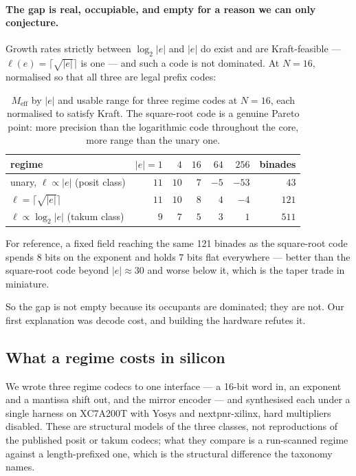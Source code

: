 \documentclass[11pt]{article}
\theoremstyle{definition}
\begin{document}
\paragraph{The gap is real, occupiable, and empty for a reason we can only
conjecture.} Growth rates strictly between $\log_2|e|$ and $|e|$ do exist and are
Kraft-feasible --- $\ell(e) = \lceil\sqrt{|e|}\rceil$ is one --- and such a code
is not dominated. At $N = 16$, normalised so that all three are legal prefix
codes:

\begin{table}[t]\centering
\caption{$M_{\mathrm{eff}}$ by $|e|$ and usable range for three regime codes at
$N = 16$, each normalised to satisfy Kraft. The square-root code is a genuine
Pareto point: more precision than the logarithmic code throughout the core, more
range than the unary one.}
\label{tab:codes}
\begin{tabular}{lrrrrrr}
\toprule
regime & $|e|{=}1$ & $4$ & $16$ & $64$ & $256$ & binades \\
\midrule
unary, $\ell \propto |e|$ (posit class)      & $11$ & $10$ & $7$ & $-5$ & $-53$ & $43$ \\
$\ell = \lceil\sqrt{|e|}\rceil$              & $11$ & $10$ & $8$ & $4$  & $-4$  & $121$ \\
$\ell \propto \log_2|e|$ (takum class)       & $9$  & $7$  & $5$ & $3$  & $1$   & $511$ \\
\bottomrule
\end{tabular}
\end{table}

For reference, a fixed field reaching the same 121 binades as the square-root code
spends 8 bits on the exponent and holds $7$ bits flat everywhere --- better than
the square-root code beyond $|e| \approx 30$ and worse below it, which is the
taper trade in miniature.

So the gap is not empty because its occupants are dominated; they are not. Our
first explanation was decode cost, and building the hardware refutes it.

\subsection{What a regime costs in silicon}\label{sec:regimecost}

We wrote three regime codecs to one interface --- a 16-bit word in, an exponent
and a mantissa shift out, and the mirror encoder --- and synthesised each under a
single harness on XC7A200T with Yosys and nextpnr-xilinx, hard multipliers
disabled. These are structural models of the three classes, not reproductions of
the published posit or takum codecs; what they compare is a run-scanned regime
against a length-prefixed one, which is the structural difference the taxonomy
names.
\end{document}
